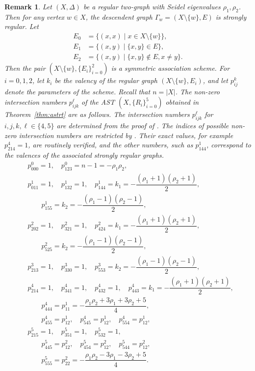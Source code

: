 \documentclass[11pt,oneside]{amsart}
\newtheorem{remark}[theorem]{Remark}
\begin{document}
{\begin{remark}\label{rem:number_rt}\textup{
Let $(X,\Delta)$ be a regular two-graph with Seidel eigenvalues $\rho_1,\rho_2$. 
Then for any vertex $w\in X$, the descendent graph $\Gamma_w=(X\setminus\{w\},E)$ is strongly regular. 
Let 
\begin{align*}
    E_0&=\big\{(x,x) \mid x\in X\setminus\{w\}\big\},\\
    E_1&=\big\{(x,y) \mid \{x,y\}\in E\big\},\\
    E_2&=\big\{(x,y) \mid \{x,y\}\not\in E,x\neq y\big\}.
  \end{align*}
Then the pair $(X\setminus\{w\},\{E_i\}_{i=0}^2)$ is a symmetric association scheme. 
For $i=0,1,2$, let $k_i$ be the valency of the regular graph $(X\setminus\{w\},E_i)$, and let $p_{ij}^k$ denote the parameters of the scheme. 
Recall that $n=|X|$. 
The non-zero intersection numbers $p_{ijk}^\ell$ of the AST $(X,\{R_i\}_{i=0}^5)$ obtained in Theorem~\ref{thm:astrt} 
are as follows.
The intersection numbers $p_{ijk}^\ell$ for $i,j,k,\ell\in\{4,5\}$ are determined from the proof of \cite[Lemma~5.5]{MR1272106}.   
The indices of possible non-zero intersection numbers are restricted by \cite[Proposition~2.7] {MR1272106}. Their exact values, for example $p_{214}^4=1$, are routinely verified, and the other numbers, such as $p_{144}^1$, correspond to the valences of the associated strongly regular graphs.  
\[
\begin{aligned}
& p_{000}^0 = 1,\quad p_{123}^0 = n-1 = -\rho_1 \rho_2,\\[4pt]
& p_{011}^1 = 1,\quad p_{132}^1 = 1,\quad p_{144}^1 = k_1 = -\dfrac{(\rho_1+1)(\rho_2+1)}{2},\\
& \qquad p_{155}^1 = k_2 = -\dfrac{(\rho_1-1)(\rho_2-1)}{2},\\[4pt]
& p_{202}^2 = 1,\quad p_{321}^2 = 1,\quad p_{424}^2 = k_1 = -\dfrac{(\rho_1+1)(\rho_2+1)}{2},\\
& \qquad p_{525}^2 = k_2 = -\dfrac{(\rho_1-1)(\rho_2-1)}{2},\\[4pt]
& p_{213}^3 = 1,\quad p_{330}^3 = 1,\quad p_{553}^3 = k_2 = -\dfrac{(\rho_1-1)(\rho_2-1)}{2},\\[4pt]
& p_{214}^4 = 1,\quad p_{341}^4 = 1,\quad p_{432}^4 = 1,\quad p_{443}^4 = k_1 = -\dfrac{(\rho_1+1)(\rho_2+1)}{2},\\
& \qquad p_{444}^4 = p_{11}^1 = -\dfrac{\rho_1\rho_2 + 3\rho_1 + 3\rho_2 + 5}{4},\\
& \qquad p_{455}^4 = p_{12}^1,\quad p_{545}^4 = p_{12}^1,\quad p_{554}^4 = p_{12}^1,\\[4pt]
& p_{215}^5 = 1,\quad p_{351}^5 = 1,\quad p_{532}^5 = 1,\\
& \qquad p_{445}^5 = p_{12}^2,\quad p_{454}^5 = p_{12}^2,\quad p_{544}^5 = p_{12}^2,\\
& \qquad p_{555}^5 = p_{22}^2 = -\dfrac{\rho_1\rho_2 - 3\rho_1 - 3\rho_2 + 5}{4}.
\end{aligned}
\]
}\end{remark}




}
\end{document}
